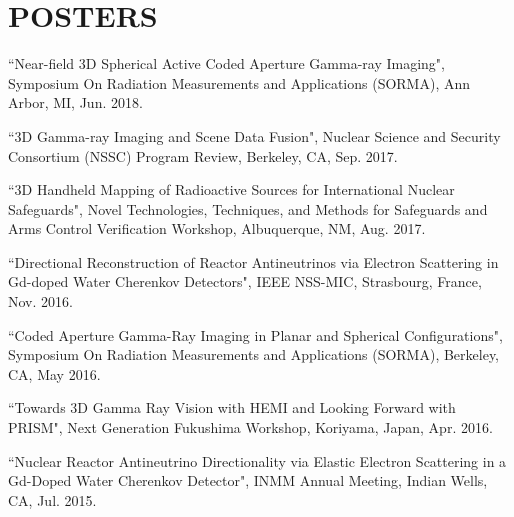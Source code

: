 \section{\small{POSTERS}}

 \begin{thebibliography}{3}
 \raggedright
 \vspace{10pt}
 
 ``Near-field 3D Spherical Active Coded Aperture Gamma-ray Imaging", Symposium On Radiation Measurements and Applications (SORMA), Ann Arbor, MI, Jun. 2018.
 
 ``3D Gamma-ray Imaging and Scene Data Fusion", Nuclear Science and Security Consortium (NSSC) Program Review, Berkeley, CA, Sep. 2017.

 ``3D Handheld Mapping of Radioactive Sources for International Nuclear Safeguards", Novel Technologies, Techniques, and Methods for Safeguards and Arms Control Verification Workshop, Albuquerque, NM, Aug. 2017.

 ``Directional Reconstruction of Reactor Antineutrinos via Electron Scattering in Gd-doped Water Cherenkov Detectors", IEEE NSS-MIC, Strasbourg, France, Nov. 2016. 

  ``Coded Aperture Gamma-Ray Imaging in Planar and Spherical Configurations", Symposium On Radiation Measurements and Applications (SORMA), Berkeley, CA, May 2016.

  ``Towards 3D Gamma Ray Vision with HEMI and Looking Forward with PRISM", Next Generation Fukushima Workshop, Koriyama, Japan, Apr. 2016.
 
  ``Nuclear Reactor Antineutrino Directionality via Elastic Electron Scattering in a Gd-Doped Water Cherenkov Detector", INMM Annual Meeting, Indian Wells, CA, Jul. 2015.
 
 \end{thebibliography}
